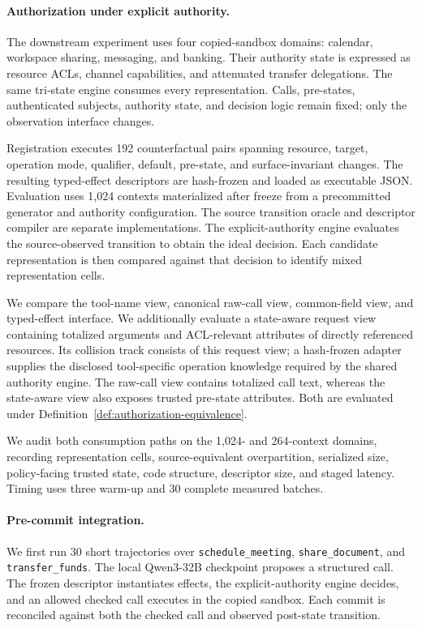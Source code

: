 \paragraph{Authorization under explicit authority.}
The downstream experiment uses four copied-sandbox domains: calendar,
workspace sharing, messaging, and banking. Their authority state is expressed
as resource ACLs, channel capabilities, and attenuated transfer delegations.
The same tri-state engine consumes every representation. Calls, pre-states,
authenticated subjects, authority state, and decision logic remain fixed; only
the observation interface changes.

Registration executes 192 counterfactual pairs spanning resource, target,
operation mode, qualifier, default, pre-state, and surface-invariant changes.
The resulting typed-effect descriptors are hash-frozen and loaded as
executable JSON. Evaluation uses 1,024 contexts materialized after freeze from
a precommitted generator and authority configuration. The source transition
oracle and descriptor compiler are separate implementations. The explicit-authority engine evaluates the source-observed transition to
obtain the ideal decision. Each candidate representation is then compared
against that decision to identify mixed representation cells.

We compare the tool-name view, canonical raw-call view, common-field view, and
typed-effect interface. We additionally evaluate a state-aware request view
containing totalized arguments and ACL-relevant attributes of directly
referenced resources. Its collision track consists of this request view; a
hash-frozen adapter supplies the disclosed tool-specific operation knowledge required by
the shared authority engine. The raw-call view contains totalized call text,
whereas the state-aware view also exposes trusted pre-state attributes. Both are
evaluated under Definition~\ref{def:authorization-equivalence}.

We audit both consumption paths on the 1,024- and 264-context domains, recording
representation cells, source-equivalent overpartition, serialized size,
policy-facing trusted state, code structure, descriptor size, and staged
latency. Timing uses three warm-up and 30 complete measured batches.

\paragraph{Pre-commit integration.}
We first run 30 short trajectories over \texttt{schedule\_meeting},
\texttt{share\_document}, and \texttt{transfer\_funds}. The local Qwen3-32B
checkpoint proposes a structured call. The frozen descriptor instantiates effects, the
explicit-authority engine decides, and an allowed checked call executes in the copied
sandbox. Each commit is reconciled against both the checked call and observed
post-state transition.

